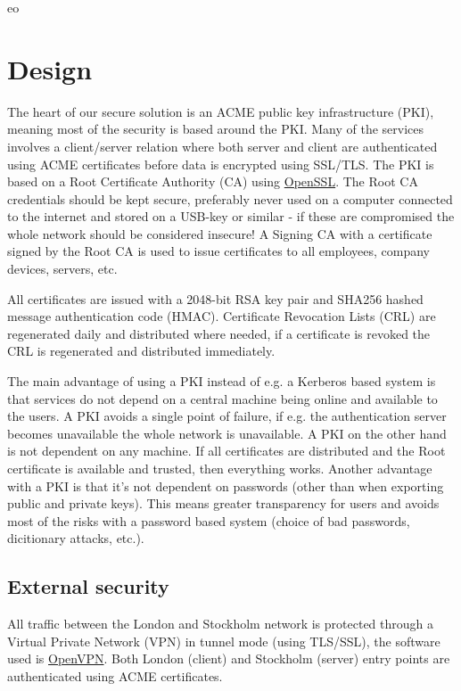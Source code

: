 eo\section*{Design}

The heart of our secure solution is an ACME public key infrastructure (PKI), meaning most of the security is based around the PKI. Many of the services involves a client/server relation where both server and client are authenticated using ACME certificates before data is encrypted using SSL/TLS. The PKI is based on a Root Certificate Authority (CA) using \href{http://www.openssl.org/}{OpenSSL}. The Root CA credentials should be kept secure, preferably never used on a computer connected to the internet and stored on a USB-key or similar - if these are compromised the whole network should be considered insecure! A Signing CA with a certificate signed by the Root CA is used to issue certificates to all employees, company devices, servers, etc. 

All certificates are issued with a 2048-bit RSA key pair and SHA256 hashed message authentication code (HMAC). Certificate Revocation Lists (CRL) are regenerated daily and distributed where needed, if a certificate is revoked the CRL is regenerated and distributed immediately.

The main advantage of using a PKI instead of e.g. a Kerberos based system is that services do not depend on a central machine being online and available to the users. A PKI avoids a single point of failure, if e.g. the authentication server becomes unavailable the whole network is unavailable. A PKI on the other hand is not dependent on any machine. If all certificates are distributed and the Root certificate is available and trusted, then everything works. Another advantage with a PKI is that it's not dependent on passwords (other than when exporting public and private keys). This means greater transparency for users and avoids most of the risks with a password based system (choice of bad passwords, dicitionary attacks, etc.).

\subsection*{External security}

All traffic between the London and Stockholm network is protected through a Virtual Private Network (VPN) in tunnel mode (using TLS/SSL), the software used is \href{http://openvpn.net/}{OpenVPN}. Both London (client) and Stockholm (server) entry points are authenticated using ACME certificates. 

